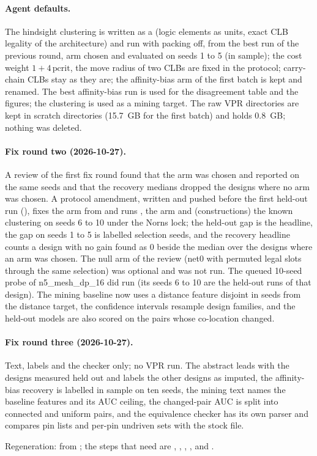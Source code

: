\paragraph{Agent defaults.} The hindsight clustering is written as a  (logic elements as units, exact CLB legality of the architecture) and run with packing off, from the best run of the previous round, arm chosen and evaluated on seeds 1 to 5 (in sample); the cost weight $1+4\,\mathrm{pcrit}$, the move radius of two CLBs are fixed in the protocol; carry-chain CLBs stay as they are; the affinity-bias arm of the first batch is kept and renamed. The best affinity-bias run is used for the disagreement table and the figures; the  clustering is used as a mining target. The raw VPR directories are kept in scratch directories (15.7~GB for the first batch) and  holds 0.8~GB; nothing was deleted.

\paragraph{Fix round two (2026-10-27).} A review of the first fix round found that the arm was chosen and reported on the same seeds and that the recovery medians dropped the designs where no arm was chosen. A protocol amendment, written and pushed before the first held-out run (), fixes the arm from  and runs , the arm and (constructions) the known clustering on seeds 6 to 10 under the Norns lock; the held-out gap is the headline, the gap on seeds 1 to 5 is labelled selection seeds, and the recovery headline counts a design with no gain found as 0 beside the median over the designs where an arm was chosen. The null arm of the review (net0 with permuted legal slots through the same selection) was optional and was not run. The queued 10-seed probe of n5\_mesh\_dp\_16 did run (its seeds 6 to 10 are the held-out runs of that design). The mining baseline now uses a distance feature disjoint in seeds from the distance target, the confidence intervals resample design families, and the held-out models are also scored on the pairs whose co-location changed.

\paragraph{Fix round three (2026-10-27).} Text, labels and the checker only; no VPR run. The abstract leads with the designs measured held out and labels the other designs as imputed, the affinity-bias recovery is labelled in sample on ten seeds, the mining text names the baseline features and its AUC ceiling, the changed-pair AUC is split into connected and uniform pairs, and the equivalence checker has its own parser and compares pin lists and per-pin undriven sets with the stock file.

Regeneration:  from ; the steps that need  are , , , ,  and .
